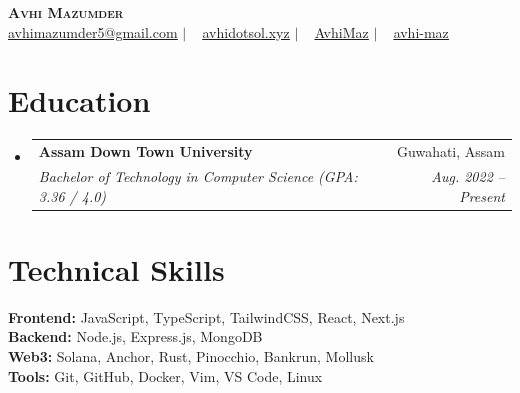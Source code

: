 \documentclass[letterpaper,11pt]{article}
\makeatletter
\newcommand{\resumeSubheading}[4]{
  \vspace{-2pt}\item
    \begin{tabular*}{0.97\textwidth}[t]{l@{\extracolsep{\fill}}r}
      \textbf{#1} & #2 \\
      \textit{\small#3} & \textit{\small #4} \\
    \end{tabular*}\vspace{-7pt}
}
\newcommand{\resumeSubHeadingListStart}{\begin{itemize}[leftmargin=0.15in, label={}]}
\newcommand{\resumeSubHeadingListEnd}{\end{itemize}}
\makeatother
\begin{document}
\begin{center}
  \textbf{\Huge \scshape Avhi Mazumder} \\ \vspace{1pt}
  \small
  \hspace{0.1em}
  \href{mailto:avhimazumder5@gmail.com}{\underline{avhimazumder5@gmail.com}} $|$ \ 
  \hspace{0.1em}
  \href{https://avhidotsol.xyz/}{\underline{avhidotsol.xyz}} $|$ \ 
  \hspace{0.1em}
  \href{https://github.com/AvhiMaz}{\underline{AvhiMaz}} $|$ \ 
  \hspace{0.1em}
  \href{https://www.linkedin.com/in/avhi-maz/}{\underline{avhi-maz}}
\end{center}

\section{Education}
  \resumeSubHeadingListStart

    \resumeSubheading
      {Assam Down Town University}{Guwahati, Assam}
      {Bachelor of Technology in Computer Science \newline\space(GPA: 3.36 / 4.0)}{Aug. 2022 -- Present}

  \resumeSubHeadingListEnd

\section{Technical Skills}
\begin{itemize}[leftmargin=0.15in, label={}]
  \small{\item{
    \textbf{Frontend:} JavaScript, TypeScript, TailwindCSS, React, Next.js \\
    \textbf{Backend:} Node.js, Express.js, MongoDB \\
    \textbf{Web3:} Solana, Anchor, Rust, Pinocchio, Bankrun, Mollusk \\
    \textbf{Tools:} Git, GitHub, Docker, Vim, VS Code, Linux
  }}
\end{itemize}
\end{document}
